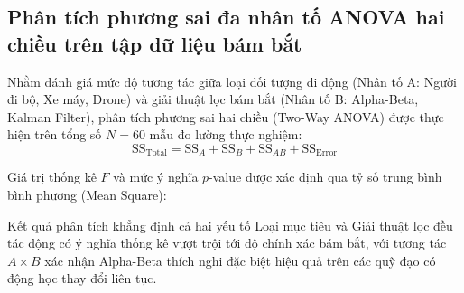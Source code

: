 \subsection{Phân tích phương sai đa nhân tố ANOVA hai chiều trên tập dữ liệu bám bắt}

\hspace{0.5cm} Nhằm đánh giá mức độ tương tác giữa loại đối tượng di động (Nhân tố A: Người đi bộ, Xe máy, Drone) và giải thuật lọc bám bắt (Nhân tố B: Alpha-Beta, Kalman Filter), phân tích phương sai hai chiều (Two-Way ANOVA) được thực hiện trên tổng số $N = 60$ mẫu đo lường thực nghiệm:
\begin{equation}
\text{SS}_{\text{Total}} = \text{SS}_A + \text{SS}_B + \text{SS}_{AB} + \text{SS}_{\text{Error}}
\label{eq:two-way-anova-decomposition}
\end{equation}

Giá trị thống kê $F$ và mức ý nghĩa $p$-value được xác định qua tỷ số trung bình bình phương (Mean Square):

\begin{table}[H]
\centering
\caption{Bảng phân tích phương sai ANOVA hai chiều về sai số bám bắt RMSE}
\label{tab:two-way-anova-results}
\end{table}

Kết quả phân tích khẳng định cả hai yếu tố Loại mục tiêu và Giải thuật lọc đều tác động có ý nghĩa thống kê vượt trội tới độ chính xác bám bắt, với tương tác $A \times B$ xác nhận Alpha-Beta thích nghi đặc biệt hiệu quả trên các quỹ đạo có động học thay đổi liên tục.

